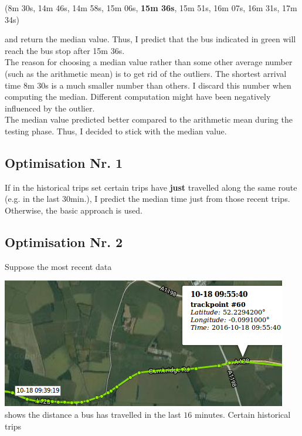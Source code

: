 \documentclass[12pt,a4paper,oneside,openright]{report}
\begin{document}
(8m 30s, 14m 46s, 14m 58s, 15m 06s, \textbf{15m 36s}, 15m 51s, 16m 07s, 16m 31s,
 17m 34s)

\:
\:

and return the median value. Thus, I predict that the bus indicated in green will
reach the bus stop after 15m 36s. \\

The reason for choosing a median value rather than some other average number
(such as the arithmetic mean) is to get rid of the outliers. The shortest arrival time
8m 30s is a much smaller number than others. I discard this number when computing
the median. Different computation might have been negatively influenced by the outlier. \\

The median value predicted better compared to the arithmetic mean during the testing
phase. Thus, I decided to stick with the median value.

\subsection{Optimisation Nr. 1}

If in the historical trips set certain trips have \textbf{just} travelled along
the same route (e.g. in the last $30$min.), I predict the median time just from
those recent trips. Otherwise, the basic approach is used.

\subsection{Optimisation Nr. 2}

Suppose the most recent data

\includegraphics[scale = 0.7]{figs/recent_trip.png} \\

shows the distance a bus has travelled in the last $16$ minutes. Certain historical
trips
\end{document}
